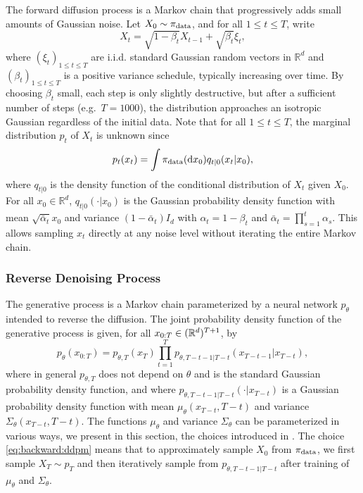 \documentclass[english,graybox,envcountchap,envcountsame,sectrefs,shortlabels]{svmono}
\theoremstyle{style}
\newcommand{\eqsp}{}
\begin{document}
The forward diffusion process is a Markov chain that progressively
adds small amounts of Gaussian noise. Let $X_0 \sim \pi_{{\rm data}}$, and for all $1\leqslant t \leqslant T$, write 
\[
X_t = \sqrt{1 - \beta_t } X_{t-1} + \sqrt{\beta_t} \xi_t\eqsp,
\]
where $(\xi_t)_{1\leqslant t \leqslant T}$ are i.i.d. standard Gaussian random vectors in $\mathbb{R}^d$ and $(\beta_t)_{1\leqslant t \leqslant T}$ is a positive variance schedule, typically increasing over time. By choosing $\beta_t$ small, each step is only slightly destructive, but after a sufficient number of steps (e.g.\ $T = 1000$), the distribution approaches an isotropic Gaussian regardless of the initial data. Note that for all $1\leqslant t\leqslant T$, the marginal distribution $p_t$ of $X_t$ is unknown since
$$
p_t(x_t) = \int \pi_{{\rm data}}(\rmd x_0)q_{t|0}(x_t|x_0)\eqsp,
$$
where $q_{t|0}$ is the density function of the conditional distribution of $X_t$ given $X_0$. For all $x_0\in\mathbb{R}^d$, $q_{t|0}(\cdot|x_0)$ is the Gaussian probability density function with mean $\sqrt{\bar{\alpha}_t} x_0$ and variance $(1 - \bar{\alpha}_t) I_d$ with $\alpha_t = 1 - \beta_t$ and $\bar{\alpha}_t = \prod_{s=1}^t \alpha_s$. This allows sampling $x_t$ directly at any noise level without iterating the entire Markov chain.

\subsubsection*{Reverse Denoising Process}

The generative process is a Markov chain parameterized by a neural network
$p_\theta$ intended to reverse the diffusion. The joint probability density function of the generative process is given, for all $x_{0:T}\in(\mathbb{R}^d)^{T+1}$, by
\begin{equation}
\label{eq:backward:ddpm}
p_\theta(x_{0:T}) = p_{\theta,T}(x_T)\prod_{t=1}^Tp_{\theta,T-t-1|T-t}(x_{T-t-1}|x_{T-t})\eqsp,
\end{equation}
where in general $p_{\theta,T}$ does not depend on $\theta$ and is the standard Gaussian probability density function, and where $p_{\theta,T-t-1|T-t}(\cdot|x_{T-t})$ is a Gaussian probability density function with mean $\mu_\theta(x_{T-t}, T-t)$ and variance $\Sigma_\theta(x_{T-t}, T-t)$.  The functions $\mu_\theta$ and variance $\Sigma_\theta$ can be parameterized in various ways, we present in this section, the choices introduced in \cite{ho2020denoising}. The choice \eqref{eq:backward:ddpm} means that to approximately sample $X_0$ from $\pi_{{\rm data}}$, we first sample $X_T\sim p_T$ and then iteratively sample from $p_{\theta,T-t-1|T-t}$ after training of $\mu_\theta$ and $\Sigma_\theta$.
\end{document}
